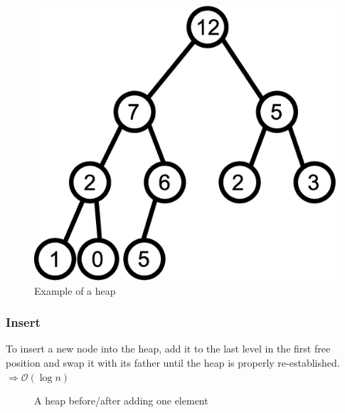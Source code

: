 \begin{figure}[h!]
\centering
\includegraphics[scale=0.5]{images/CM2/tree1.eps}
\caption{Example of a heap}
\label{tree1}
\end{figure}

\subsubsection{Insert} 
To insert a new node into the heap, add it to the last level in the first free position and swap it with its father until the heap is properly re-established. \newline
$\Rightarrow \mathcal{O}(\log n)$\\

\begin{figure}[htbp]
\centering
{}
\caption{A heap before/after adding one element}
\label{tree2_3}
\end{figure}

